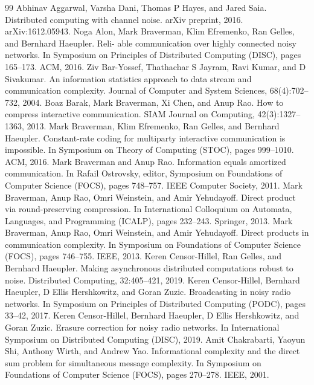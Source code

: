 \begin{thebibliography}{99}
 Abhinav Aggarwal, Varsha Dani, Thomas P Hayes, and Jared Saia. Distributed computing with channel noise. arXiv preprint, 2016. arXiv:1612.05943.
 Noga Alon, Mark Braverman, Klim Efremenko, Ran Gelles, and Bernhard Haeupler. Reli- able communication over highly connected noisy networks. In Symposium on Principles of Distributed Computing (DISC), pages 165–173. ACM, 2016.
 Ziv Bar-Yossef, Thathachar S Jayram, Ravi Kumar, and D Sivakumar. An information statistics approach to data stream and communication complexity. Journal of Computer and System Sciences, 68(4):702–732, 2004.
 Boaz Barak, Mark Braverman, Xi Chen, and Anup Rao. How to compress interactive communication. SIAM Journal on Computing, 42(3):1327–1363, 2013.
 Mark Braverman, Klim Efremenko, Ran Gelles, and Bernhard Haeupler. Constant-rate coding for multiparty interactive communication is impossible. In Symposium on Theory of Computing (STOC), pages 999–1010. ACM, 2016.
 Mark Braverman and Anup Rao. Information equals amortized communication. In Rafail Ostrovsky, editor, Symposium on Foundations of Computer Science (FOCS), pages 748–757. IEEE Computer Society, 2011.
 Mark Braverman, Anup Rao, Omri Weinstein, and Amir Yehudayoff. Direct product via round-preserving compression. In International Colloquium on Automata, Languages, and Programming (ICALP), pages 232–243. Springer, 2013.
 Mark Braverman, Anup Rao, Omri Weinstein, and Amir Yehudayoff. Direct products in communication complexity. In Symposium on Foundations of Computer Science (FOCS), pages 746–755. IEEE, 2013.
 Keren Censor-Hillel, Ran Gelles, and Bernhard Haeupler. Making asynchronous distributed computations robust to noise. Distributed Computing, 32:405–421, 2019.
 Keren Censor-Hillel, Bernhard Haeupler, D Ellis Hershkowitz, and Goran Zuzic. Broadcasting in noisy radio networks. In Symposium on Principles of Distributed Computing (PODC), pages 33–42, 2017.
 Keren Censor-Hillel, Bernhard Haeupler, D Ellis Hershkowitz, and Goran Zuzic. Erasure correction for noisy radio networks. In International Symposium on Distributed Computing (DISC), 2019.
 Amit Chakrabarti, Yaoyun Shi, Anthony Wirth, and Andrew Yao. Informational complexity and the direct sum problem for simultaneous message complexity. In Symposium on Foundations of Computer Science (FOCS), pages 270–278. IEEE, 2001.

\end{thebibliography}
